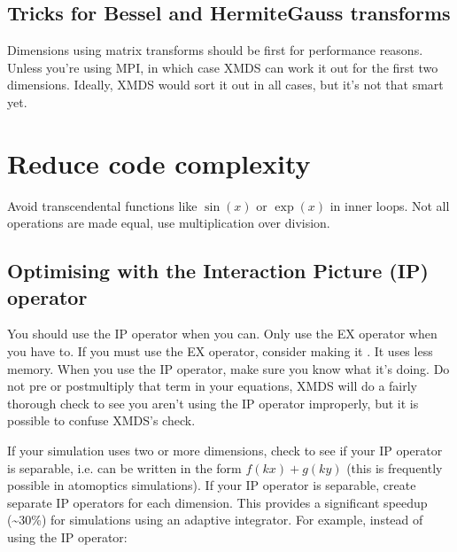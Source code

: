 \documentclass[letterpaper,10pt,english]{sphinxmanual}
\begin{document}
\subsection{Tricks for Bessel and Hermite\sphinxhyphen{}Gauss transforms}
\label{\detokenize{optimisation_hints:tricks-for-bessel-and-hermite-gauss-transforms}}
\sphinxAtStartPar
Dimensions using matrix transforms should be first for performance reasons.  Unless you’re using MPI, in which case XMDS can work it out for the first two dimensions.  Ideally, XMDS would sort it out in all cases, but it’s not that smart yet.


\section{Reduce code complexity}
\label{\detokenize{optimisation_hints:reduce-code-complexity}}
\sphinxAtStartPar
Avoid transcendental functions like \(\sin(x)\) or \(\exp(x)\) in inner loops. Not all operations are made equal, use multiplication over division.


\subsection{Optimising with the Interaction Picture (IP) operator}
\label{\detokenize{optimisation_hints:optimising-with-the-interaction-picture-ip-operator}}\label{\detokenize{optimisation_hints:optimisingipoperators}}
\sphinxAtStartPar
You should use the IP operator when you can. Only use the EX operator when you have to. If you must use the EX operator, consider making it . It uses less memory.
When you use the IP operator, make sure you know what it’s doing.  Do not pre\sphinxhyphen{} or post\sphinxhyphen{}multiply that term in your equations, XMDS will do a fairly thorough check to see you aren’t using the IP operator improperly, but it is possible to confuse XMDS’s check.

\sphinxAtStartPar
If your simulation uses two or more dimensions, check to see if your IP operator is separable, i.e. can be written in the form \(f(kx) + g(ky)\) (this is frequently possible in atom\sphinxhyphen{}optics simulations). If your IP operator is separable, create separate IP operators for each dimension.  This provides a significant speedup (\textasciitilde{}30\%) for simulations using an adaptive integrator.  For example, instead of using the IP operator:
\end{document}

